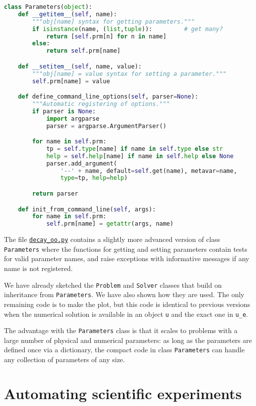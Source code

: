 \documentclass[graybox,sectrefs,envcountresetchap,open=right,final]{svmonodo}
\begin{document}
\begin{lstlisting}[language=Python,style=blue1_bluegreen]
class Parameters(object):
    def __getitem__(self, name):
        """obj[name] syntax for getting parameters."""
        if isinstance(name, (list,tuple)):         # get many?
            return [self.prm[n] for n in name]
        else:
            return self.prm[name]

    def __setitem__(self, name, value):
        """obj[name] = value syntax for setting a parameter."""
        self.prm[name] = value

    def define_command_line_options(self, parser=None):
        """Automatic registering of options."""
        if parser is None:
            import argparse
            parser = argparse.ArgumentParser()

        for name in self.prm:
            tp = self.type[name] if name in self.type else str
            help = self.help[name] if name in self.help else None
            parser.add_argument(
                '--' + name, default=self.get(name), metavar=name,
                type=tp, help=help)

        return parser

    def init_from_command_line(self, args):
        for name in self.prm:
            self.prm[name] = getattr(args, name)
\end{lstlisting}
The file \href{{http://tinyurl.com/ofkw6kc/softeng/decay_oo.py}}{\nolinkurl{decay_oo.py}} contains
a slightly more advanced version of class \texttt{Parameters} where
the functions for getting and setting parameters
contain tests for valid parameter names, and
raise exceptions with informative messages if any name is not registered.

We have already sketched the \texttt{Problem} and \texttt{Solver} classes that build
on inheritance from \texttt{Parameters}. We have also shown how they are
used. The only remaining code is to make the plot, but this code is
identical to previous versions when the numerical solution is
available in an object \texttt{u} and the exact one in \Verb!u_e!.

The advantage with the \texttt{Parameters} class is that it scales to problems
with a large number of physical and numerical parameters:
as long as the parameters are defined once via a dictionary,
the compact code in class \texttt{Parameters} can handle any collection of
parameters of any size.

\section{Automating scientific experiments}
\label{softeng1:experiments}
\end{document}
